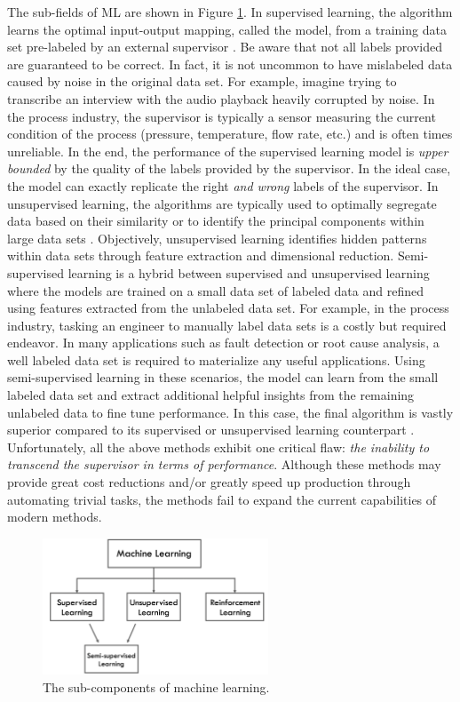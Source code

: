 The sub-fields of ML are shown in Figure \ref{fig:MLGoals}.  In supervised learning, the algorithm learns the optimal input-output mapping, called the model, from a training data set pre-labeled by an external supervisor \cite{sutton}.  Be aware that not all labels provided are guaranteed to be correct. In fact, it is not uncommon to  have mislabeled data caused by noise in the original data set. For example, imagine trying to transcribe an interview with the audio playback heavily corrupted by noise.  In the process industry, the supervisor is typically a sensor measuring the current condition of the process (pressure, temperature, flow rate, etc.) and is often times unreliable. In the end, the performance of the supervised learning model is \textit{upper bounded} by the quality of the labels provided by the supervisor.  In the ideal case, the model can exactly replicate the right \textit{and wrong} labels of the supervisor. In unsupervised learning, the algorithms are typically used to optimally segregate data based on their similarity or to identify the principal components within large data sets \cite{Hinton, sutton}.  Objectively, unsupervised learning identifies hidden patterns within data sets through feature extraction and dimensional reduction. Semi-supervised learning is a hybrid between supervised and unsupervised learning where the models are trained on a small data set of labeled data and refined using features extracted from the unlabeled data set. For example, in the process industry, tasking an engineer to manually label data sets is a costly but required endeavor.  In many applications such as fault detection or root cause analysis, a well labeled data set is required to materialize any useful applications.  Using semi-supervised learning in these scenarios, the model can learn from the small labeled data set and extract additional helpful insights from the remaining unlabeled data to fine tune performance.  In this case, the final algorithm is vastly superior compared to its supervised or unsupervised learning counterpart \cite{machine_learning}.  Unfortunately, all the above methods exhibit one critical flaw: \textit{the inability to transcend the supervisor in terms of performance}. Although these methods may provide great cost reductions and/or greatly speed up production through automating trivial tasks, the methods fail to expand the current capabilities of modern methods.

\begin{figure}[H]
    \centering
    \includegraphics[width=0.6\textwidth]{images/ch1/MLGoals.jpeg}
    \caption{The sub-components of machine learning.}
    \label{fig:MLGoals}
\end{figure}   

